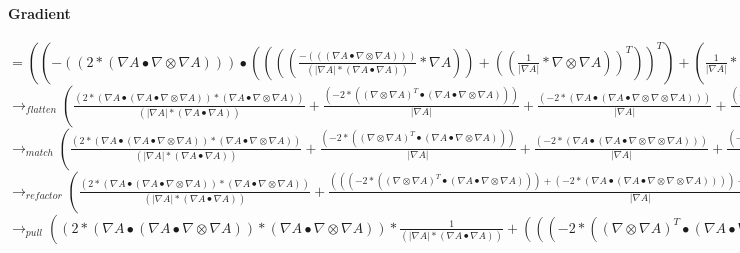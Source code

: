 \documentclass{article}
\begin{document}
 \paragraph{Gradient}
$= ((-((2*( \nabla A \bullet  \nabla  \otimes  \nabla A))) \bullet (((( \frac{-((( \nabla A \bullet  \nabla  \otimes  \nabla A)))}{(| \nabla A|*( \nabla A \bullet  \nabla A))}* \nabla A))+(( \frac{1}{| \nabla A|}* \nabla  \otimes  \nabla A))^T))^T)+( \frac{1}{| \nabla A|}*( \nabla A \bullet (-((2*((( \nabla A \bullet  \nabla  \otimes  \nabla  \otimes  \nabla A))^T+((( \nabla  \otimes  \nabla A)^T \bullet  \nabla  \otimes  \nabla A))^T))))^T)))$
\newline $\rightarrow_{flatten}( \frac{(2*( \nabla A \bullet ( \nabla A \bullet  \nabla  \otimes  \nabla A))*( \nabla A \bullet  \nabla  \otimes  \nabla A))}{(| \nabla A|*( \nabla A \bullet  \nabla A))}+ \frac{(-2*(( \nabla  \otimes  \nabla A)^T \bullet ( \nabla A \bullet  \nabla  \otimes  \nabla A)))}{| \nabla A|}+ \frac{(-2*( \nabla A \bullet ( \nabla A \bullet  \nabla  \otimes  \nabla  \otimes  \nabla A)))}{| \nabla A|}+ \frac{(-2*( \nabla A \bullet (( \nabla  \otimes  \nabla A)^T \bullet  \nabla  \otimes  \nabla A)))}{| \nabla A|})$
\newline $\rightarrow_{match}( \frac{(2*( \nabla A \bullet ( \nabla A \bullet  \nabla  \otimes  \nabla A))*( \nabla A \bullet  \nabla  \otimes  \nabla A))}{(| \nabla A|*( \nabla A \bullet  \nabla A))}+ \frac{(-2*(( \nabla  \otimes  \nabla A)^T \bullet ( \nabla A \bullet  \nabla  \otimes  \nabla A)))}{| \nabla A|}+ \frac{(-2*( \nabla A \bullet ( \nabla A \bullet  \nabla  \otimes  \nabla  \otimes  \nabla A)))}{| \nabla A|}+ \frac{(-2*( \nabla A \bullet (( \nabla  \otimes  \nabla A)^T \bullet  \nabla  \otimes  \nabla A)))}{| \nabla A|})$
\newline $\rightarrow_{refactor}( \frac{(2*( \nabla A \bullet ( \nabla A \bullet  \nabla  \otimes  \nabla A))*( \nabla A \bullet  \nabla  \otimes  \nabla A))}{(| \nabla A|*( \nabla A \bullet  \nabla A))}+ \frac{(((-2*(( \nabla  \otimes  \nabla A)^T \bullet ( \nabla A \bullet  \nabla  \otimes  \nabla A)))+(-2*( \nabla A \bullet ( \nabla A \bullet  \nabla  \otimes  \nabla  \otimes  \nabla A))))+(-2*( \nabla A \bullet (( \nabla  \otimes  \nabla A)^T \bullet  \nabla  \otimes  \nabla A))))}{| \nabla A|})$
\newline $\rightarrow_{pull}((2*( \nabla A \bullet ( \nabla A \bullet  \nabla  \otimes  \nabla A))*( \nabla A \bullet  \nabla  \otimes  \nabla A))* \frac{1}{(| \nabla A|*( \nabla A \bullet  \nabla A))}+(((-2*(( \nabla  \otimes  \nabla A)^T \bullet ( \nabla A \bullet  \nabla  \otimes  \nabla A)))+(-2*( \nabla A \bullet ( \nabla A \bullet  \nabla  \otimes  \nabla  \otimes  \nabla A))))+(-2*( \nabla A \bullet (( \nabla  \otimes  \nabla A)^T \bullet  \nabla  \otimes  \nabla A))))* \frac{1}{| \nabla A|})$
  
\end{document}
